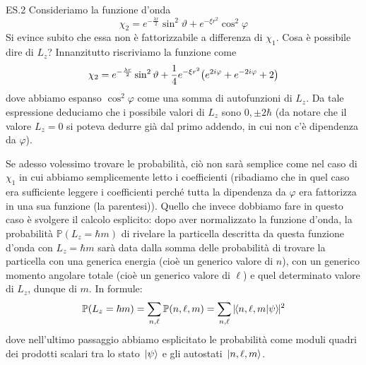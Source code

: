 \begin{soluzione}
   \vspace{0.2cm} ES.2 Consideriamo la funzione d'onda
   \begin{equation*}
      \chi_2=e^{-\frac{\lambda r}{2}} \sin^2{\vartheta} + e^{-\xi r^2}\cos^2{\varphi}
   \end{equation*}
   Si evince subito che essa non è fattorizzabile a differenza di $\chi_1$.
   Cosa è possibile dire di $L_z$? Innanzitutto riscriviamo la funzione come
   \begin{equation*}
      \chi_2=e^{-\frac{\lambda r}{2}} \sin^2{\vartheta} + 
      \frac{1}{4}e^{-\xi r^2} \qty( e^{2i\varphi} + e^{-2i\varphi} + 2)
   \end{equation*}
   dove abbiamo espanso $\cos^2{\varphi}$ come una somma di autofunzioni di $\hat{L}_z$. Da tale espressione deduciamo che i possibile valori di $L_z$ sono $0,\pm 2 \hbar$ (da notare che il valore $L_z=0$ si poteva dedurre già dal primo addendo, in cui non c'è dipendenza da $\varphi$).

   Se adesso volessimo trovare le probabilità, ciò non sarà semplice come nel caso di $\chi_1$ in cui abbiamo semplicemente letto i coefficienti (ribadiamo che in quel caso era sufficiente leggere i coefficienti perché tutta la dipendenza da $\varphi$ era fattorizza in una sua funzione (la parentesi)). Quello che invece dobbiamo fare in questo caso è svolgere il calcolo esplicito: dopo aver normalizzato la funzione d'onda, la probabilità $\mathbb{P}(L_z=\hbar m)$ di rivelare la particella descritta da questa funzione d'onda con $L_z=\hbar m$ sarà data dalla somma delle probabilità di trovare la particella con una generica energia (cioè un generico valore di $n$), con un generico momento angolare totale (cioè un generico valore di $\ell$) e quel determinato valore di $L_z$, dunque di $m$. In formule:
   \begin{equation*}
      \mathbb{P}(L_z=\hbar m)
      =\sum_{n,\ell} \mathbb{P}(n,\ell,m)
      =\sum_{n,\ell} | \hspace{-0.1cm} \braket*{n,\ell,m}{\psi} \hspace{-0.1cm} |^2
   \end{equation*}
   dove nell'ultimo passaggio abbiamo esplicitato le probabilità come moduli quadri dei prodotti scalari tra lo stato $\ket*{\psi}$ e gli autostati $\ket*{n,\ell,m}$.


\end{soluzione}
